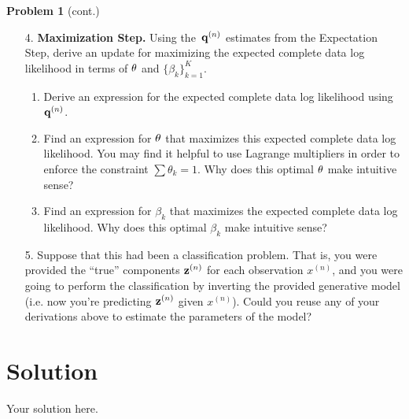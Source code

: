 \documentclass[submit]{../harvardml}
\newenvironment{solution}
  {\color{blue}\section*{Solution}}
{}
\begin{document}
\begin{framed}
  \noindent\textbf{Problem 1} (cont.)\\
  \begin{enumerate}
    \item[4.] \textbf{Maximization Step.}
    Using the~$\mathbf{q}^{(n)}$ estimates from the Expectation Step, derive an update for maximizing the expected complete data log likelihood in terms of $\mathbf{\theta}$ and $\{ \beta_k \}^K_{k=1}$.

    \begin{enumerate}
      \item Derive an expression for the expected complete data log likelihood using $\mathbf{q}^{(n)}$.
      \item Find an expression for $\mathbf{\theta}$ that maximizes this expected complete data log likelihood. You may find it helpful to use Lagrange multipliers in order to enforce the constraint $\sum \theta_k = 1$. Why does this optimal $\mathbf{\theta}$ make intuitive sense?
      \item Find an expression for $\beta_k$ that maximizes the expected complete data log likelihood.  Why does this optimal $\beta_k$  make intuitive sense?
    \end{enumerate}
      
    \item[5.] Suppose that this had been a classification problem. That is,
    you were provided the ``true'' components $\mathbf{z}^{(n)}$ for each
    observation $x^{(n)}$,
    and you were going to perform the classification by
    inverting the provided generative model (i.e. now you're predicting $\mathbf{z}^{(n)}$ given $x^{(n)}$). Could you reuse any of
    your derivations above to estimate the parameters of the model?
  \end{enumerate}
\end{framed}



\begin{solution}
	Your solution here.
\end{solution}

\newpage
\end{document}
